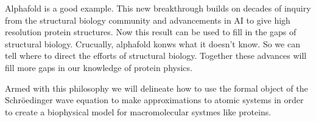Alphafold is a good example. This new breakthrough builds on decades of inquiry from the structural biology community and advancements in AI to give high resolution protein structures. Now this result can be used to fill in the gaps of structural biology. Crucually, alphafold konws what it doesn't know. So we can tell where to direct the efforts of structural biology. Together these advances will fill more gaps in our knowledge of protein physics. 

Armed with this philosophy we will delineate how to use the formal object of the Schr\"oedinger wave equation to make approximations to atomic systems in order to create a biophysical model for macromolecular systmes like proteins.
